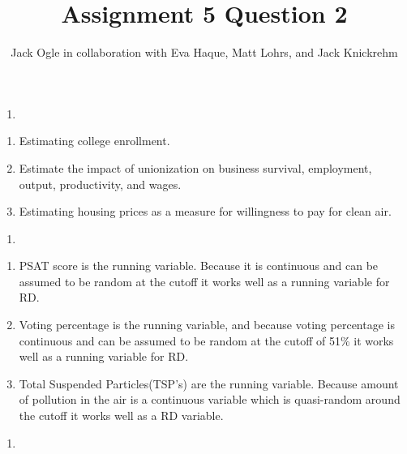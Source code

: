 \documentclass[
  12pt,
  landscape]{article}
\title{Assignment 5 Question 2}
\author{Jack Ogle in collaboration with Eva Haque, Matt Lohrs, and Jack
Knickrehm}
\date{}
\begin{document}
\maketitle

\begin{enumerate}
\def\labelenumi{(\alph{enumi})}
\item
\end{enumerate}

\begin{enumerate}
\def\labelenumi{\roman{enumi})}
\item
  Estimating college enrollment.
\item
  Estimate the impact of unionization on business survival, employment,
  output, productivity, and wages.
\item
  Estimating housing prices as a measure for willingness to pay for
  clean air.
\end{enumerate}

\begin{enumerate}
\def\labelenumi{(\alph{enumi})}
\setcounter{enumi}{1}
\item
\end{enumerate}

\begin{enumerate}
\def\labelenumi{\roman{enumi})}
\item
  PSAT score is the running variable. Because it is continuous and can
  be assumed to be random at the cutoff it works well as a running
  variable for RD.
\item
  Voting percentage is the running variable, and because voting
  percentage is continuous and can be assumed to be random at the cutoff
  of 51\% it works well as a running variable for RD.
\item
  Total Suspended Particles(TSP's) are the running variable. Because
  amount of pollution in the air is a continuous variable which is
  quasi-random around the cutoff it works well as a RD variable.
\end{enumerate}

\begin{enumerate}
\def\labelenumi{(\alph{enumi})}
\setcounter{enumi}{2}
\item
\end{enumerate}
\end{document}
